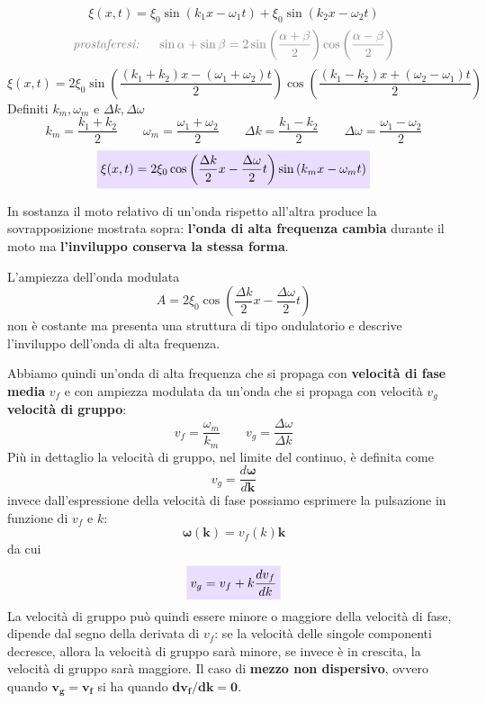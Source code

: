 \documentclass[x11names]{report}
\newcommand{\viola}[1]{\colorbox{yred}{$\displaystyle #1$}}
\begin{document}
	\[ 
	\xi(x,t) = \xi_0\sin\left(k_1x -\omega_1 t\right) + \xi_0\sin\left(k_2x -\omega_2 t\right)
	\]
	\[ 
	\textcolor{gray}{\textit{prostaferesi: } \quad \sin\alpha + \sin\beta = 2\sin\left(\frac{\alpha + \beta}{2}\right)\cos\left(\frac{\alpha - \beta}{2}\right)}
	\]
	\[ 
	\xi(x,t) = 2\xi_0\sin\left(\frac{(k_1 + k_2)x - (\omega_1 + \omega_2)t}{2}\right) \cos\left(\frac{(k_1 - k_2)x + (\omega_2 - \omega_1)t}{2}\right)
	\]
	Definiti \(k_m,\omega _m\) e \(\Delta k,\Delta\omega\)
	\[ 
	\boxed{k_m = \frac{k_1 + k_2}{2}} \qquad \boxed{\omega _m = \frac{\omega _1 + \omega _2}{2}} \qquad \boxed{\Delta k=\frac{k_1 - k_2}{2}} \qquad \boxed{\Delta \omega = \frac{\omega_1 - \omega_2}{2}}
	\]
	\[ 
	\viola{\xi(x,t) = 2\xi_0\cos\left(\frac{\Delta k}{2}x - \frac{\Delta\omega}{2}t \right)\sin\left(k_mx - \omega_mt\right)}
	\]

	
	
	In sostanza il moto relativo di un'onda rispetto all'altra produce la sovrapposizione mostrata sopra: \textbf{l'onda di alta frequenza cambia} durante il moto ma \textbf{l'inviluppo conserva la stessa forma}.
	
	L'ampiezza dell'onda modulata
	\[ 
	A = 2\xi_0\cos\left(\frac{\Delta k}{2}x - \frac{\Delta\omega}{2}t \right)
	\]
	non è costante ma presenta una struttura di tipo ondulatorio e descrive l'inviluppo dell'onda di alta frequenza.
	
	Abbiamo quindi un'onda di alta frequenza che si propaga con \textbf{velocità di fase media} \(v_f\) e con ampiezza modulata da un'onda che si propaga con velocità \(v_g\) \textbf{velocità di gruppo}:
	\[ 
	v_f = \frac{\omega _m}{k_m} \qquad v_g = \frac{\Delta \omega }{\Delta k}
	\]
	Più in dettaglio la velocità di gruppo, nel limite del continuo, è definita come 
	\[ 
	v_g = \frac{d\boldsymbol{\omega} }{d\boldsymbol{k}}
	\]
	invece dall'espressione della velocità di fase possiamo esprimere la pulsazione in funzione di \(v_f\) e \(k\):
	\[ 
	\boldsymbol{\omega (k)} = v_f(k)\boldsymbol{k}
	\]
	da cui
	\begin{equation}\label{relazione di dispersione}
		\viola{v_g = v_f + k\frac{dv_f}{dk}} 
	\end{equation}
	La velocità di gruppo può quindi essere minore o maggiore della velocità di fase, dipende dal segno della derivata di \(v_f\): se la velocità delle singole componenti decresce, allora la velocità di gruppo sarà minore, se invece è in crescita, la velocità di gruppo sarà maggiore. Il caso di \textbf{mezzo non dispersivo}, ovvero quando \(\boldsymbol{v_g = v_f}\) si ha quando \(\boldsymbol{dv_f/dk = 0}\).
	
\end{document}

